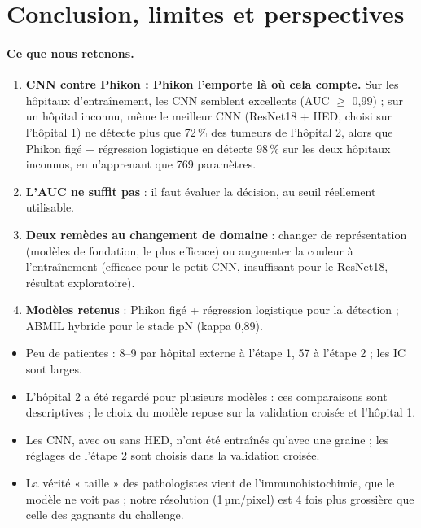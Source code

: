 \documentclass[11pt,a4paper]{article}
\begin{document}
\section{Conclusion, limites et perspectives}

\paragraph{Ce que nous retenons.}
\begin{enumerate}
  \item \textbf{CNN contre Phikon : Phikon l'emporte là où cela compte.} Sur les hôpitaux d'entraînement, les CNN semblent
        excellents (AUC $\geq$ 0,99) ; sur un hôpital inconnu, même le meilleur CNN (ResNet18 + HED, choisi sur l'hôpital 1) ne détecte plus que 72\,\% des
        tumeurs de l'hôpital 2, alors que Phikon figé + régression logistique en détecte 98\,\% sur les deux hôpitaux inconnus, en
        n'apprenant que 769 paramètres.
  \item \textbf{L'AUC ne suffit pas} : il faut évaluer la décision, au seuil réellement utilisable.
  \item \textbf{Deux remèdes au changement de domaine} : changer de représentation (modèles de fondation, le plus efficace) ou
        augmenter la couleur à l'entraînement (efficace pour le petit CNN, insuffisant pour le ResNet18, résultat exploratoire).
  \item \textbf{Modèles retenus} : Phikon figé + régression logistique pour la détection ; ABMIL hybride pour le stade pN (kappa 0,89).
\end{enumerate}

\begin{limite}[Limites]
\begin{itemize}
  \item Peu de patientes : 8–9 par hôpital externe à l'étape 1, 57 à l'étape 2 ; les IC sont larges.
  \item L'hôpital 2 a été regardé pour plusieurs modèles : ces comparaisons sont descriptives ; le choix du modèle repose sur la
        validation croisée et l'hôpital 1.
  \item Les CNN, avec ou sans HED, n'ont été entraînés qu'avec une graine ; les réglages de l'étape 2 sont choisis dans la validation croisée.
  \item La vérité « taille » des pathologistes vient de l'immunohistochimie, que le modèle ne voit pas ; notre résolution (1\,µm/pixel)
        est 4 fois plus grossière que celle des gagnants du challenge.
\end{itemize}
\end{limite}
\end{document}
